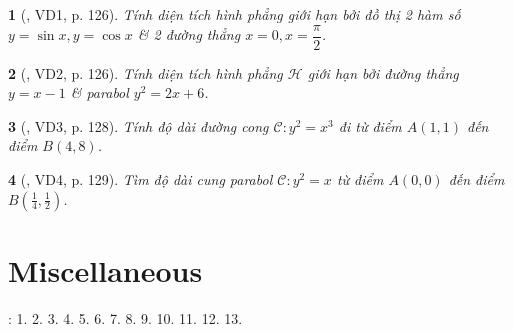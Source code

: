 \documentclass{article}
\newtheorem{baitoan}{}
\begin{document}
\begin{baitoan}[\cite{TLCT_giai_tich_12}, VD1, p. 126]
	Tính diện tích hình phẳng giới hạn bởi đồ thị 2 hàm số $y = \sin x,y = \cos x$ \& 2 đường thẳng $x = 0,x = \dfrac{\pi}{2}$.
\end{baitoan}

\begin{baitoan}[\cite{TLCT_giai_tich_12}, VD2, p. 126]
	Tính diện tích hình phẳng $\mathcal{H}$ giới hạn bởi đường thẳng $y = x - 1$ \& parabol $y^2 = 2x + 6$.
\end{baitoan}

\begin{baitoan}[\cite{TLCT_giai_tich_12}, VD3, p. 128]
	Tính độ dài đường cong $\mathcal{C}:y^2 = x^3$ đi từ điểm $A(1,1)$ đến điểm $B(4,8)$.
\end{baitoan}

\begin{baitoan}[\cite{TLCT_giai_tich_12}, VD4, p. 129]
	Tìm độ dài cung parabol $\mathcal{C}:y^2 = x$ từ điểm $A(0,0)$ đến điểm $B\left(\frac{1}{4},\frac{1}{2}\right)$.
\end{baitoan}


\section{Miscellaneous}
\cite[BTCCIV, pp. 42--44]{SGK_Toan_12_Canh_Dieu_tap_2}: 1. 2. 3. 4. 5. 6. 7. 8. 9. 10. 11. 12. 13.


\printbibliography[heading=bibintoc]
	
\end{document}

